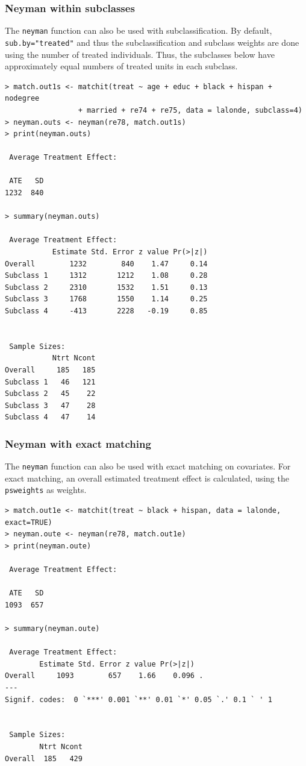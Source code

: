 \documentclass[oneside,letterpaper,titlepage]{article}
\begin{document}
\subsubsection{Neyman within subclasses}
The {\tt neyman} function can also be used with subclassification.  By
default, {\tt sub.by="treated"} and thus the subclassification and
subclass weights are done using the number of treated individuals.
Thus, the subclasses below have approximately equal numbers of treated
units in each subclass.

\begin{verbatim}
> match.out1s <- matchit(treat ~ age + educ + black + hispan + nodegree
                 + married + re74 + re75, data = lalonde, subclass=4)
> neyman.outs <- neyman(re78, match.out1s)
> print(neyman.outs)
 
 Average Treatment Effect:
  
 ATE   SD
1232  840
 
> summary(neyman.outs)
 
 Average Treatment Effect:
           Estimate Std. Error z value Pr(>|z|)
Overall        1232        840    1.47     0.14
Subclass 1     1312       1212    1.08     0.28
Subclass 2     2310       1532    1.51     0.13
Subclass 3     1768       1550    1.14     0.25
Subclass 4     -413       2228   -0.19     0.85
 
 
 Sample Sizes:
           Ntrt Ncont
Overall     185   185
Subclass 1   46   121
Subclass 2   45    22
Subclass 3   47    28
Subclass 4   47    14
\end{verbatim}

\subsubsection{Neyman with exact matching}
The {\tt neyman} function can also be used with exact matching on
covariates.  For exact matching, an overall estimated treatment effect
is calculated, using the {\tt psweights} as weights.

\begin{verbatim}
> match.out1e <- matchit(treat ~ black + hispan, data = lalonde, exact=TRUE)
> neyman.oute <- neyman(re78, match.out1e)
> print(neyman.oute)
 
 Average Treatment Effect:
  
 ATE   SD
1093  657
 
> summary(neyman.oute)
 
 Average Treatment Effect:
        Estimate Std. Error z value Pr(>|z|)
Overall     1093        657    1.66    0.096 .
---
Signif. codes:  0 `***' 0.001 `**' 0.01 `*' 0.05 `.' 0.1 ` ' 1
 
 
 Sample Sizes:
        Ntrt Ncont
Overall  185   429
\end{verbatim}
\end{document}
